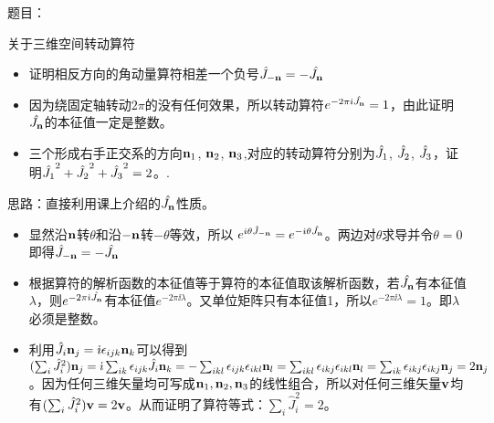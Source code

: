 \documentclass[CJK]{beamer}
\begin{document}
\begin{frame}
\bch
题目：
{\small 关于三维空间转动算符
\begin{itemize}
\item{证明相反方向的角动量算符相差一个负号$\hat{J}_{-{\mathbf{n}}} = - {\hat{J_{\mathbf{n}}}}$}
\item{因为绕固定轴转动$2\pi$的没有任何效果，所以转动算符$e^{-2\pi{\dot{\imath}}{\hat{J_{\mathbf{n}}}}}=1$，由此证明${\hat{J_{\mathbf{n}}}}$的本征值一定是整数。}
\item{三个形成右手正交系的方向${\mathbf{n}}_1$, ${\mathbf{n}}_2$, ${\mathbf{n}}_3$,对应的转动算符分别为$\hat{J_{1}} $, $\hat{J_{2}} $, $\hat{J_{3}}$，证明$\hat{J_{1}}^2+\hat{J_{2}}^2+\hat{J_{3}}^2 = 2$。.}
\end{itemize}
}

\skipline

思路：直接利用课上介绍的${\hat{J_{\mathbf{n}}}}$性质。
\ech
\end{frame}


\begin{frame}
\bch
\begin{itemize}
\item{显然沿${\mathbf{n}}$转$\theta$和沿$-{\mathbf{n}}$转$-\theta$等效，所以 $ e^{{\dot{\imath}} \theta \hat{J}_{-{\mathbf{n}}}}= e^{-{\dot{\imath}}\theta {\hat{J_{\mathbf{n}}}}}  $。两边对$\theta$求导并令$\theta = 0$即得$\hat{J}_{-{\mathbf{n}}} = - {\hat{J_{\mathbf{n}}}}$}
\item{根据算符的解析函数的本征值等于算符的本征值取该解析函数，若${\hat{J_{\mathbf{n}}}}$有本征值$\lambda$，则$e^{-2\pi{\dot{\imath}}{\hat{J_{\mathbf{n}}}}}$有本征值$e^{-2\pi\ii\lambda}$。又单位矩阵只有本征值1，所以$e^{-2\pi\ii\lambda}=1$。即$\lambda$必须是整数。}
\item{利用$\hat{J_{i}}{\mathbf{n}}_j = {\dot{\imath}}\epsilon_{ijk}{\mathbf{n}}_k$可以得到
$(\sum_i\hat{J}_i^2){\mathbf{n}}_{j} = {\dot{\imath}} \sum_{ik} \epsilon_{ijk} \hat{J}_i {\mathbf{n}}_k = -\sum_{ikl} \epsilon_{ijk}\epsilon_{ikl}{\mathbf{n}}_l =\sum_{ikl} \epsilon_{ikj}\epsilon_{ikl}{\mathbf{n}}_l = \sum_{ik} \epsilon_{ikj}\epsilon_{ikj}{\mathbf{n}}_j =2{\mathbf{n}}_j$。因为任何三维矢量均可写成${\mathbf{n}}_1,{\mathbf{n}}_2,{\mathbf{n}}_3$的线性组合，所以对任何三维矢量${\mathbf{v}}$均有$(\sum_i\hat{J}_i^2){\mathbf{v}} = 2{\mathbf{v}}$。从而证明了算符等式：$\sum_i\hat{J}_i^2 =2$。
}
\end{itemize}
\ech
\end{frame}

\begin{frame}
\bch
\ech
\end{frame}
\end{document}
